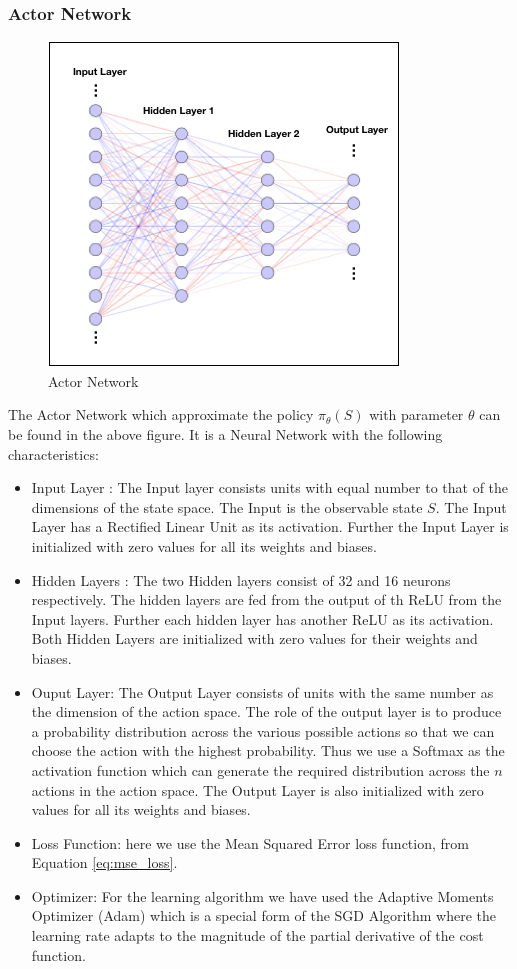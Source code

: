 \documentclass[14pt]{extarticle}
\numberwithin{equation}{section}
\begin{document}
	\subsubsection{Actor Network}
			\begin{figure}[h]
		\vspace{0.2cm}
		\centering
		\includegraphics[scale=0.6]{nn-actor}
		\caption{Actor Network
			\label{nn-actor}}
	\end{figure}
	The Actor Network which approximate the policy $\pi_{\theta}(S)$ with parameter $\theta$ can be found in the above figure. It is a Neural Network with the following characteristics:
	\begin{itemize}
		\item Input Layer : The Input layer consists units with equal number to that of the dimensions of the state space. The Input is the observable state $S$. The Input Layer has a Rectified Linear Unit as its activation. Further the Input Layer is initialized with zero values for all its weights and biases. 
		\item Hidden Layers : The two Hidden layers consist of 32 and 16 neurons respectively. The hidden layers are fed from the output of th ReLU from the Input layers. Further each hidden layer has another ReLU as its activation. Both Hidden Layers are initialized with zero values for their weights and biases.
		\item Ouput Layer: The Output Layer consists of units with the same number as the dimension of the action space. The role of the output layer is to produce a probability distribution across the various possible actions so that we can choose the action with the highest probability. Thus we use a Softmax as the activation function which can generate the required distribution across the $n$ actions in the action space. The Output Layer is also initialized with zero values for all its weights and biases.
		\item Loss Function: here we use the Mean Squared Error loss function, from Equation \eqref{eq:mse_loss}.
		\item Optimizer: For the learning algorithm we have used the Adaptive Moments Optimizer (Adam)\cite{kingma2014adam} which is a special form of the SGD Algorithm where the learning rate adapts to the magnitude of the partial derivative of the cost function. 
	\end{itemize}
\end{document}
